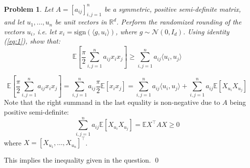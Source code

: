 \documentclass[12pt]{article}
\newtheorem{ex}{Problem}
\begin{document}
\begin{bx}
	
	\begin{ex}
	Let $A=[a_{ij}]_{i,j=1}^n$ be a symmetric, positive semi-definite matrix, and let $u_1,\dots,u_n$
	be unit vectors in $\mathbb{R}^d$. Perform the randomized rounding of the vectors $u_i$, i.e. let $x_i=\mathrm{sign}(\langle g,u_i\rangle)$, where $g\sim \mathcal{N}(0,I_d)$. Using identity (\ref{eq:1}), show that:
	\[
	\mathbb{E}\left [ \frac{\pi}{2}\sum_{i,j=1}^{n}a_{ij}x_ix_j\right ] \ge \sum_{i,j=1}^{n}a_{ij}\langle u_i,u_j\rangle
	\]

	\end{ex}
	\tcblower
	\[
	\mathbb{E}\left [ \frac{\pi}{2}\sum_{i,j=1}^{n}a_{ij}x_ix_j\right ] = \sum_{i,j=1}^{n}a_{ij}\frac{\pi}{2}\mathbb{E}[x_ix_j] =
	\sum_{i,j=1}^{n}a_{ij}\langle u_i,u_j\rangle + \sum_{i,j=1}^{n}a_{ij}\mathbb{E}[X_{u_i}X_{u_j}]
	\]
	Note that the right summand in the last equality is non-negative due to $A$ being positive semi-definite:
	\[
	\sum_{i,j=1}^{n}a_{ij}\mathbb{E}[X_{u_i}X_{u_j}] = \mathbb{E}X^\top A X \ge 0
	\]
	where $X=[X_{u_1},\dots,X_{u_n}]^\top$.
	
	This implies the inequality given in the question.
	\qed
\end{bx}
\end{document}
